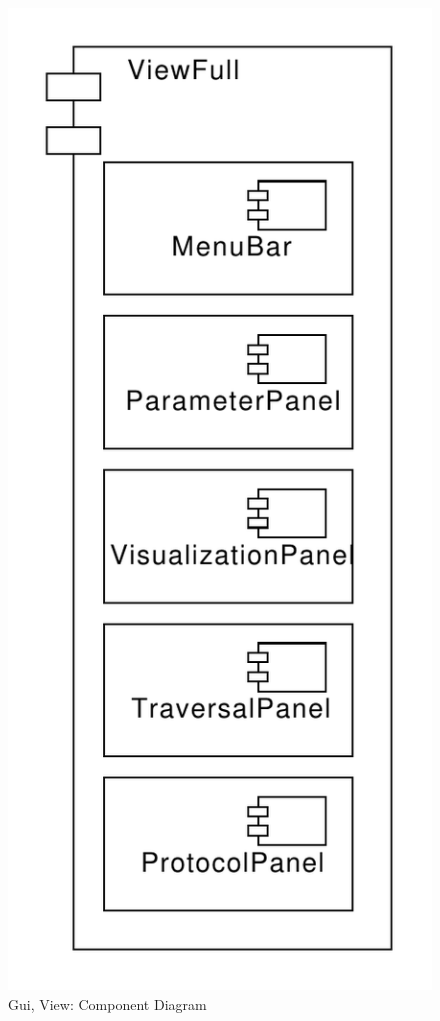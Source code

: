 % 
\begin{figure}[H]
    \centering
    \includegraphics[scale=0.5]{diagrams/designmodel/cd-view-full.pdf}
    \caption{Gui, View: Component Diagram}
    \label{fig:gui-view-cd}
\end{figure}
% 
